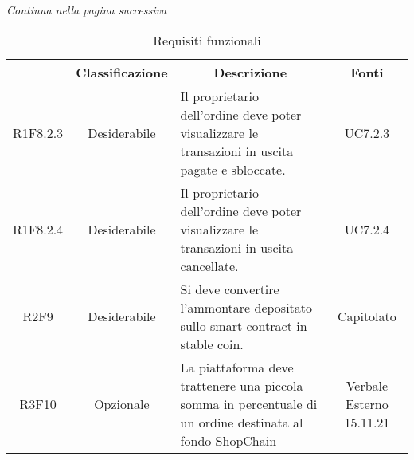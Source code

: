 \begin{center}
    \textit{\small Continua nella pagina successiva}
\end{center} 
\begin{table}[H]
    \centering
    \renewcommand{\arraystretch}{1.8}
    \begin{tabular}{c | c | p{6cm} | c}
        \rowcolor[HTML]{125E28} 
        \multicolumn{1}{c}{\color[HTML]{FFFFFF} \textbf{Codice}} & 
		\multicolumn{1}{c}{\color[HTML]{FFFFFF} \textbf{Classificazione}} & 
		\multicolumn{1}{c}{\color[HTML]{FFFFFF} \textbf{Descrizione}} & 
		\multicolumn{1}{c}{\color[HTML]{FFFFFF} \textbf{Fonti}} \\
        \hline
        R1F8.2.3 & Desiderabile & Il proprietario dell'ordine deve poter visualizzare le transazioni in uscita pagate e sbloccate. & UC7.2.3 \\
        R1F8.2.4 & Desiderabile & Il proprietario dell'ordine deve poter visualizzare le transazioni in uscita cancellate. & UC7.2.4 \\
        R2F9 & Desiderabile & Si deve convertire l'ammontare depositato sullo smart contract in stable coin. & Capitolato \\
        R3F10 & Opzionale & La piattaforma deve trattenere una piccola somma in percentuale di un ordine destinata al fondo ShopChain & Verbale Esterno 15.11.21 \\
    \end{tabular}
    \caption{Requisiti funzionali}
\end{table}

